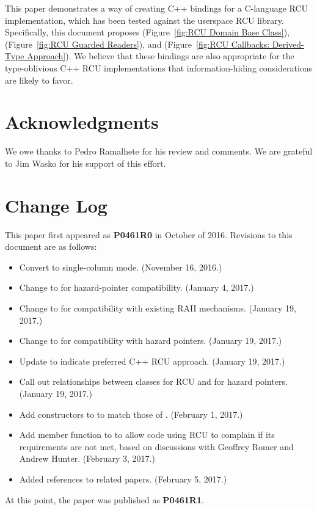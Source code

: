 \documentclass[letterpaper,10pt]{article}
\begin{document}
This paper demonstrates a way of creating C++ bindings for a C-language
RCU implementation, which has been tested against the userspace RCU
library.
Specifically, this document proposes
 (Figure~\ref{fig:RCU Domain Base Class}),
 (Figure~\ref{fig:RCU Guarded Readers}), and
 (Figure~\ref{fig:RCU Callbacks: Derived-Type Approach}).
We believe that these bindings are also appropriate for the type-oblivious
C++ RCU implementations that information-hiding considerations are likely
to favor.

\section*{Acknowledgments}

We owe thanks to Pedro Ramalhete for his review and comments.
We are grateful to Jim Wasko for his support of this effort.

%
%

%




\section*{Change Log}
\label{sec:Change Log}

This paper first appeared as {\bf P0461R0} in October of 2016.
Revisions to this document are as follows:

\begin{itemize}
\item	Convert to single-column mode.
	(November 16, 2016.)
\item	Change  to  for hazard-pointer compatibility.
	(January 4, 2017.)
\item	Change  to  for compatibility
	with existing RAII mechanisms.
	(January 19, 2017.)
\item	Change  to  for compatibility
	with hazard pointers.
	(January 19, 2017.)
\item	Update to indicate preferred C++ RCU approach.
	(January 19, 2017.)
\item	Call out relationships between classes for RCU and for hazard
	pointers.
	(January 19, 2017.)
\item	Add constructors to  to match those of
	.
	(February 1, 2017.)
\item	Add  member function to
	 to allow code using RCU to complain if
	its requirements are not met, based on discussions with
	Geoffrey Romer and Andrew Hunter.
	(February 3, 2017.)
\item	Added references to related papers.
	(February 5, 2017.)
\end{itemize}

At this point, the paper was published as {\bf P0461R1}.
\end{document}
